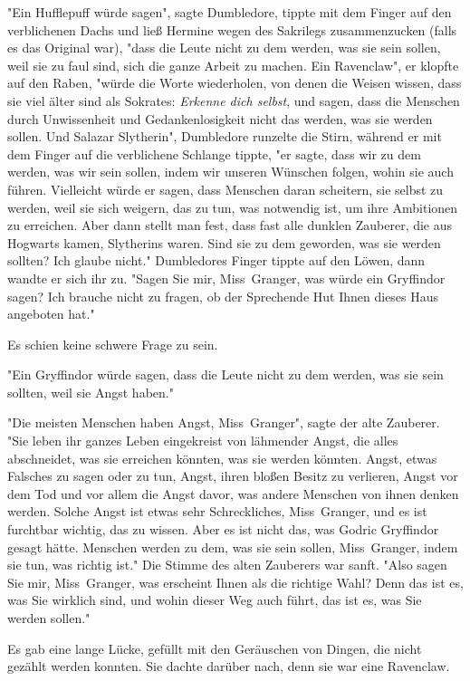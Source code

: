 {"Ein Hufflepuff würde sagen", sagte Dumbledore, tippte mit dem Finger auf den verblichenen Dachs und ließ Hermine wegen des Sakrilegs zusammenzucken (falls es das Original war), "dass die Leute nicht zu dem werden, was sie sein sollen, weil sie zu faul sind, sich die ganze Arbeit zu machen. Ein Ravenclaw", er klopfte auf den Raben, "würde die Worte wiederholen, von denen die Weisen wissen, dass sie viel älter sind als Sokrates: \emph{Erkenne dich selbst}, und sagen, dass die Menschen durch Unwissenheit und Gedankenlosigkeit nicht das werden, was sie werden sollen. Und Salazar Slytherin", Dumbledore runzelte die Stirn, während er mit dem Finger auf die verblichene Schlange tippte, "er sagte, dass wir zu dem werden, was wir sein sollen, indem wir unseren Wünschen folgen, wohin sie auch führen. Vielleicht würde er sagen, dass Menschen daran scheitern, sie selbst zu werden, weil sie sich weigern, das zu tun, was notwendig ist, um ihre Ambitionen zu erreichen. Aber dann stellt man fest, dass fast alle dunklen Zauberer, die aus Hogwarts kamen, Slytherins waren. Sind sie zu dem geworden, was sie werden sollten? Ich glaube nicht." Dumbledores Finger tippte auf den Löwen, dann wandte er sich ihr zu. "Sagen Sie mir, Miss~Granger, was würde ein Gryffindor sagen? Ich brauche nicht zu fragen, ob der Sprechende Hut Ihnen dieses Haus angeboten hat."

Es schien keine schwere Frage zu sein.

"Ein Gryffindor würde sagen, dass die Leute nicht zu dem werden, was sie sein sollten, weil sie Angst haben."

"Die meisten Menschen haben Angst, Miss~Granger", sagte der alte Zauberer. "Sie leben ihr ganzes Leben eingekreist von lähmender Angst, die alles abschneidet, was sie erreichen könnten, was sie werden könnten. Angst, etwas Falsches zu sagen oder zu tun, Angst, ihren bloßen Besitz zu verlieren, Angst vor dem Tod und vor allem die Angst davor, was andere Menschen von ihnen denken werden. Solche Angst ist etwas sehr Schreckliches, Miss~Granger, und es ist furchtbar wichtig, das zu wissen. Aber es ist nicht das, was Godric Gryffindor gesagt hätte. Menschen werden zu dem, was sie sein sollen, Miss~Granger, indem sie tun, was richtig ist." Die Stimme des alten Zauberers war sanft. "Also sagen Sie mir, Miss~Granger, was erscheint Ihnen als die richtige Wahl? Denn das ist es, was Sie wirklich sind, und wohin dieser Weg auch führt, das ist es, was Sie werden sollen."

Es gab eine lange Lücke, gefüllt mit den Geräuschen von Dingen, die nicht gezählt werden konnten. Sie dachte darüber nach, denn sie war eine Ravenclaw.

}
